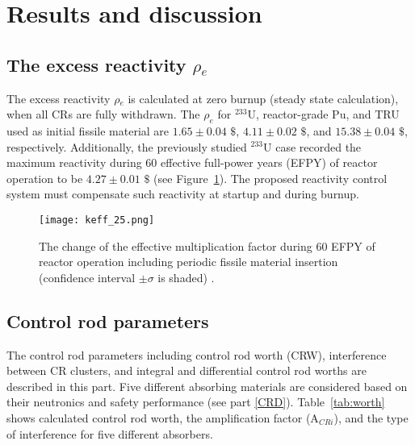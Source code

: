 \section{Results and discussion} \label{Results-and-discussion}

\subsection{The excess reactivity $\rho$$_e$}

The excess reactivity $\rho$$_e$ is calculated at zero burnup (steady state 
calculation), when all CRs are fully withdrawn. The $\rho_e$ for $^{233}$U, 
reactor-grade Pu, and TRU used as initial fissile material are $1.65\pm0.04$ 
$\$$, $4.11\pm0.02$ $\$$, and $15.38\pm0.04$ $\$$, respectively.
Additionally, the previously studied $^{233}$U case recorded the maximum reactivity
during 60 effective full-power years (EFPY) of reactor operation to be 
$4.27\pm0.01$ $\$$ (see Figure~\ref{fig:keff_25}).
The proposed reactivity control system must compensate such reactivity at startup and during burnup.
\begin{figure}
	\centering
	\texttt{[image: keff\_25.png]}
	\vspace{-0.5in}
	\caption{The change of the effective multiplication factor during 60 EFPY of reactor operation including periodic fissile material insertion (confidence interval $\pm\sigma$ is shaded) \cite{ashraf2020whole}.} 
	\label{fig:keff_25}
\end{figure}

\subsection{Control rod parameters}

The control rod parameters including control rod worth (CRW), interference 
between CR clusters, and integral and differential control rod worths are 
described in this part. Five different absorbing materials are considered based 
on their neutronics and safety performance (see part \ref{CRD}). 
Table~\ref{tab:worth} shows calculated control rod worth, the amplification 
factor (A$_{CRi}$), and the type of interference for five different 
absorbers.

